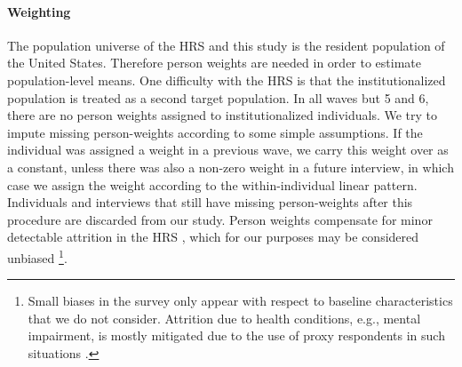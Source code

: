 \documentclass[11pt,oneside,a4paper]{article}
\begin{document}
\paragraph*{Weighting}
The population universe of the HRS and this study is the resident
population of the United States. Therefore person weights are needed in
order to estimate population-level means. 
One difficulty with the HRS is that the institutionalized population is treated
as a second target population. In all waves but 5 and 6, there are no person weights
assigned to institutionalized individuals. We try to impute missing
person-weights according to some simple assumptions. If the individual was
assigned a weight in a previous wave, we carry this weight over as a constant, unless there was also a non-zero weight in a future interview, in
which case we assign the weight according to the within-individual linear
pattern. Individuals and interviews that still have missing person-weights
after this procedure are discarded from our study. Person weights compensate for
minor detectable attrition in the HRS \citep{kapteyn2006effects}, which for
our purposes may be considered unbiased \footnote{Small biases in the survey
only appear with respect to baseline characteristics that we do not consider.
Attrition due to health conditions, e.g., mental impairment, is mostly mitigated
due to the use of proxy respondents in such situations \citep{weir2011proxy}.}.
\end{document}
